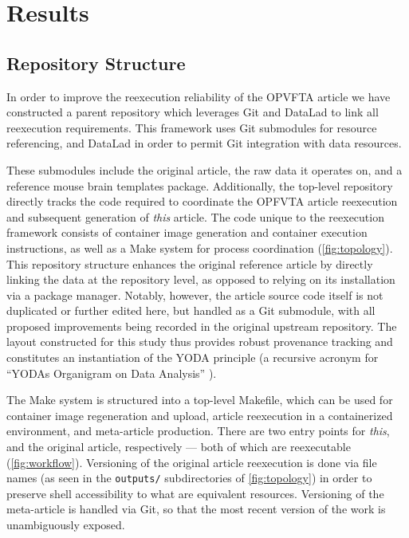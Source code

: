 \section{Results}


\subsection{Repository Structure}

In order to improve the reexecution reliability of the OPVFTA article we have constructed a parent repository which leverages Git and DataLad to link all reexecution requirements.
This framework uses Git submodules for resource referencing, and DataLad \cite{datalad} in order to permit Git integration with data resources.

These submodules include the original article, the raw data it operates on, and a reference mouse brain templates package.
Additionally, the top-level repository directly tracks the code required to coordinate the OPFVTA article reexecution and subsequent generation of \emph{this} article.
The code unique to the reexecution framework consists of container image generation and container execution instructions, as well as a Make system for process coordination (\cref{fig:topology}).
This repository structure enhances the original reference article by directly linking the data at the repository level, as opposed to relying on its installation via a package manager.
Notably, however, the article source code itself is not duplicated or further edited here, but handled as a Git submodule, with all proposed improvements being recorded in the original upstream repository.
The layout constructed for this study thus provides robust provenance tracking and constitutes an instantiation of the YODA principle (a recursive acronym for “YODAs Organigram on Data Analysis” \cite{yoda}).

The Make system is structured into a top-level Makefile, which can be used for container image regeneration and upload, article reexecution in a containerized environment, and meta-article production.
There are two entry points for \emph{this}, and the original article, respectively — both of which are reexecutable (\cref{fig:workflow}).
Versioning of the original article reexecution is done via file names (as seen in the \texttt{outputs/} subdirectories of \cref{fig:topology}) in order to preserve shell accessibility to what are equivalent resources.
Versioning of the meta-article is handled via Git, so that the most recent version of the work is unambiguously exposed.

